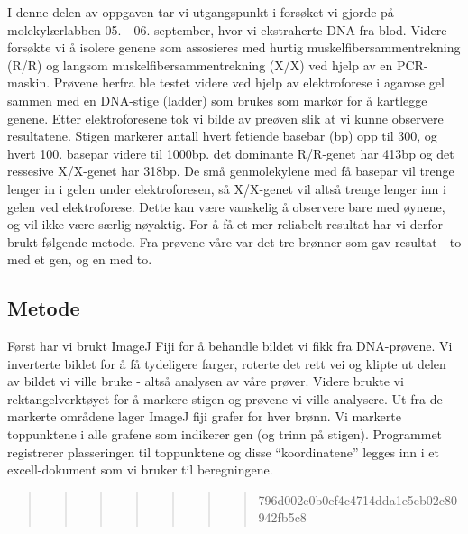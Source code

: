 \documentclass[
  letterpaper,
  DIV=11,
  numbers=noendperiod]{scrreprt}
\begin{document}
I denne delen av oppgaven tar vi utgangspunkt i forsøket vi gjorde på
molekylærlabben 05. - 06. september, hvor vi ekstraherte DNA fra blod.
Videre forsøkte vi å isolere genene som assosieres med hurtig
muskelfibersammentrekning (R/R) og langsom muskelfibersammentrekning
(X/X) ved hjelp av en PCR-maskin. Prøvene herfra ble testet videre ved
hjelp av elektroforese i agarose gel sammen med en DNA-stige (ladder)
som brukes som markør for å kartlegge genene. Etter elektroforesene tok
vi bilde av preøven slik at vi kunne observere resultatene. Stigen
markerer antall hvert fetiende basebar (bp) opp til 300, og hvert 100.
basepar videre til 1000bp. det dominante R/R-genet har 413bp og det
ressesive X/X-genet har 318bp. De små genmolekylene med få basepar vil
trenge lenger in i gelen under elektroforesen, så X/X-genet vil altså
trenge lenger inn i gelen ved elektroforese. Dette kan være vanskelig å
observere bare med øynene, og vil ikke være særlig nøyaktig. For å få et
mer reliabelt resultat har vi derfor brukt følgende metode. Fra prøvene
våre var det tre brønner som gav resultat - to med et gen, og en med to.

\subsection{Metode}\label{metode-2}

Først har vi brukt ImageJ Fiji for å behandle bildet vi fikk fra
DNA-prøvene. Vi inverterte bildet for å få tydeligere farger, roterte
det rett vei og klipte ut delen av bildet vi ville bruke - altså
analysen av våre prøver. Videre brukte vi rektangelverktøyet for å
markere stigen og prøvene vi ville analysere. Ut fra de markerte
områdene lager ImageJ fiji grafer for hver brønn. Vi markerte
toppunktene i alle grafene som indikerer gen (og trinn på stigen).
Programmet registrerer plasseringen til toppunktene og disse
``koordinatene'' legges inn i et excell-dokument som vi bruker til
beregningene.

\begin{quote}
\begin{quote}
\begin{quote}
\begin{quote}
\begin{quote}
\begin{quote}
\begin{quote}
796d002e0b0ef4c4714dda1e5eb02c80942fb5c8
\end{quote}
\end{quote}
\end{quote}
\end{quote}
\end{quote}
\end{quote}
\end{quote}
\end{document}
